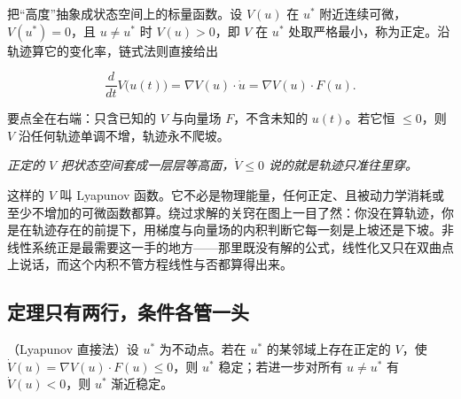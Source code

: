 把``高度''抽象成状态空间上的标量函数。设 \(V(u)\) 在 \(u^\ast\) 附近连续可微，\(V(u^\ast)=0\)，且 \(u\ne u^\ast\) 时 \(V(u)>0\)，即 \(V\) 在 \(u^\ast\) 处取严格最小，称为正定。沿轨迹算它的变化率，链式法则直接给出

\[
\frac{d}{dt}V\bigl(u(t)\bigr)
=\nabla V(u)\cdot\dot u
=\nabla V(u)\cdot F(u).
\]

要点全在右端：只含已知的 \(V\) 与向量场 \(F\)，不含未知的 \(u(t)\)。若它恒 \(\le0\)，则 \(V\) 沿任何轨迹单调不增，轨迹永不爬坡。

\begin{center}
\end{center}

\emph{正定的 \(V\) 把状态空间套成一层层等高面，\(\dot V\le0\) 说的就是轨迹只准往里穿。}

这样的 \(V\) 叫 Lyapunov 函数。它不必是物理能量，任何正定、且被动力学消耗或至少不增加的可微函数都算。绕过求解的关窍在图上一目了然：你没在算轨迹，你是在轨迹存在的前提下，用梯度与向量场的内积判断它每一刻是上坡还是下坡。非线性系统正是最需要这一手的地方——那里既没有解的公式，线性化又只在双曲点上说话，而这个内积不管方程线性与否都算得出来。

\subsection{定理只有两行，条件各管一头}

\begin{theorem}
（Lyapunov 直接法）设 \(u^\ast\) 为不动点。若在 \(u^\ast\) 的某邻域上存在正定的 \(V\)，使 \(\dot V(u)=\nabla V(u)\cdot F(u)\le0\)，则 \(u^\ast\) 稳定；若进一步对所有 \(u\ne u^\ast\) 有 \(\dot V(u)<0\)，则 \(u^\ast\) 渐近稳定。
\end{theorem}

